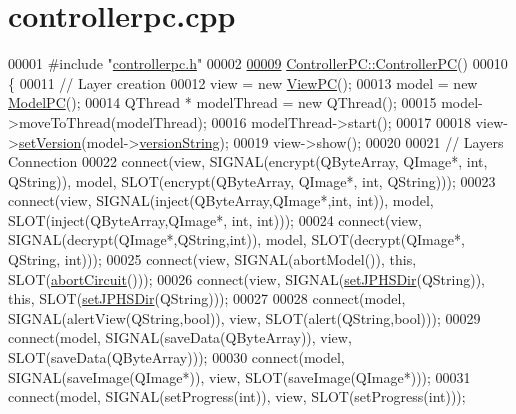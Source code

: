 \hypertarget{controllerpc_8cpp_source}{}\section{controllerpc.\+cpp}

\begin{DoxyCode}
00001 \textcolor{preprocessor}{#include "\hyperlink{controllerpc_8h}{controllerpc.h}"}
00002 
\hypertarget{controllerpc_8cpp_source.tex_l00009}{}\hyperlink{class_controller_p_c_afa6c92d67bf3b6531c42385fc5938003}{00009} \hyperlink{class_controller_p_c_afa6c92d67bf3b6531c42385fc5938003}{ControllerPC::ControllerPC}()
00010 \{
00011     \textcolor{comment}{// Layer creation}
00012     view = \textcolor{keyword}{new} \hyperlink{class_view_p_c}{ViewPC}();
00013     model = \textcolor{keyword}{new} \hyperlink{class_model_p_c}{ModelPC}();
00014     QThread * modelThread = \textcolor{keyword}{new} QThread();
00015     model->moveToThread(modelThread);
00016     modelThread->start();
00017 
00018     view->\hyperlink{class_view_p_c_ac05220df875b7c4f24405a5742476ebf}{setVersion}(model->\hyperlink{class_model_p_c_a5f426725ccf7eefd3c77ea8c720264c9}{versionString});
00019     view->show();
00020 
00021     \textcolor{comment}{// Layers Connection}
00022     connect(view, SIGNAL(encrypt(QByteArray, QImage*, \textcolor{keywordtype}{int}, QString)), model, SLOT(encrypt(QByteArray, 
      QImage*, \textcolor{keywordtype}{int}, QString)));
00023     connect(view, SIGNAL(inject(QByteArray,QImage*,\textcolor{keywordtype}{int}, \textcolor{keywordtype}{int})), model, SLOT(inject(QByteArray,QImage*, \textcolor{keywordtype}{int}, \textcolor{keywordtype}{
      int})));
00024     connect(view, SIGNAL(decrypt(QImage*,QString,\textcolor{keywordtype}{int})), model, SLOT(decrypt(QImage*, QString, \textcolor{keywordtype}{int})));
00025     connect(view, SIGNAL(abortModel()), \textcolor{keyword}{this}, SLOT(\hyperlink{class_controller_p_c_a8814989f7be1214e06b2e720889066b0}{abortCircuit}()));
00026     connect(view, SIGNAL(\hyperlink{class_controller_p_c_ac00d29685a7e5b780c01eb438e10f96d}{setJPHSDir}(QString)), \textcolor{keyword}{this}, SLOT(\hyperlink{class_controller_p_c_ac00d29685a7e5b780c01eb438e10f96d}{setJPHSDir}(QString)));
00027 
00028     connect(model, SIGNAL(alertView(QString,\textcolor{keywordtype}{bool})), view, SLOT(alert(QString,\textcolor{keywordtype}{bool})));
00029     connect(model, SIGNAL(saveData(QByteArray)), view, SLOT(saveData(QByteArray)));
00030     connect(model, SIGNAL(saveImage(QImage*)), view, SLOT(saveImage(QImage*)));
00031     connect(model, SIGNAL(setProgress(\textcolor{keywordtype}{int})), view, SLOT(setProgress(\textcolor{keywordtype}{int})));

\end{DoxyCode}

